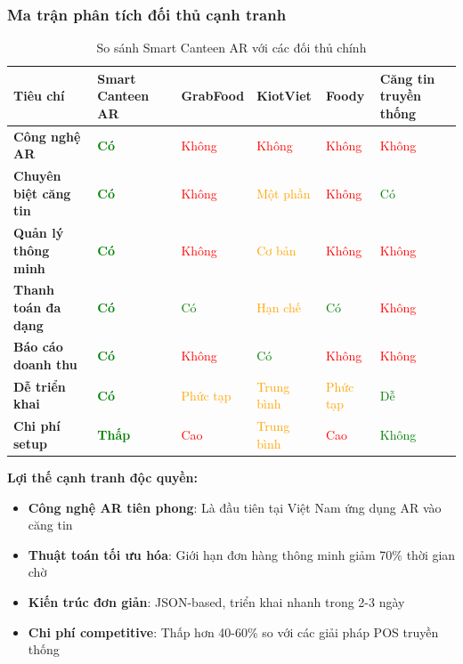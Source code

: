 \documentclass[12pt,a4paper]{article}
\begin{document}
\subsubsection{Ma trận phân tích đối thủ cạnh tranh}

\begin{table}[H]
\centering
\caption{So sánh Smart Canteen AR với các đối thủ chính}
\label{tab:competitor-analysis}
\begin{tabular}{@{}>{\raggedright\arraybackslash}p{3cm}>{\raggedright\arraybackslash}p{2cm}>{\raggedright\arraybackslash}p{2cm}>{\raggedright\arraybackslash}p{2cm}>{\raggedright\arraybackslash}p{2cm}>{\raggedright\arraybackslash}p{2cm}@{}}
\toprule
\textbf{Tiêu chí} & \textbf{Smart Canteen AR} & \textbf{GrabFood} & \textbf{KiotViet} & \textbf{Foody} & \textbf{Căng tin truyền thống} \\
\midrule
\textbf{Công nghệ AR} & \textcolor{green}{\textbf{Có}} & \textcolor{red}{Không} & \textcolor{red}{Không} & \textcolor{red}{Không} & \textcolor{red}{Không} \\
\textbf{Chuyên biệt căng tin} & \textcolor{green}{\textbf{Có}} & \textcolor{red}{Không} & \textcolor{orange}{Một phần} & \textcolor{red}{Không} & \textcolor{green}{Có} \\
\textbf{Quản lý thông minh} & \textcolor{green}{\textbf{Có}} & \textcolor{red}{Không} & \textcolor{orange}{Cơ bản} & \textcolor{red}{Không} & \textcolor{red}{Không} \\
\textbf{Thanh toán đa dạng} & \textcolor{green}{\textbf{Có}} & \textcolor{green}{Có} & \textcolor{orange}{Hạn chế} & \textcolor{green}{Có} & \textcolor{red}{Không} \\
\textbf{Báo cáo doanh thu} & \textcolor{green}{\textbf{Có}} & \textcolor{red}{Không} & \textcolor{green}{Có} & \textcolor{red}{Không} & \textcolor{red}{Không} \\
\textbf{Dễ triển khai} & \textcolor{green}{\textbf{Có}} & \textcolor{orange}{Phức tạp} & \textcolor{orange}{Trung bình} & \textcolor{orange}{Phức tạp} & \textcolor{green}{Dễ} \\
\textbf{Chi phí setup} & \textcolor{green}{\textbf{Thấp}} & \textcolor{red}{Cao} & \textcolor{orange}{Trung bình} & \textcolor{red}{Cao} & \textcolor{green}{Không} \\
\bottomrule
\end{tabular}
\end{table}

\textbf{Lợi thế cạnh tranh độc quyền:}
\begin{itemize}[leftmargin=1cm]
    \item \textbf{Công nghệ AR tiên phong}: Là đầu tiên tại Việt Nam ứng dụng AR vào căng tin
    \item \textbf{Thuật toán tối ưu hóa}: Giới hạn đơn hàng thông minh giảm 70\% thời gian chờ
    \item \textbf{Kiến trúc đơn giản}: JSON-based, triển khai nhanh trong 2-3 ngày
    \item \textbf{Chi phí competitive}: Thấp hơn 40-60\% so với các giải pháp POS truyền thống
\end{itemize}
\end{document}
